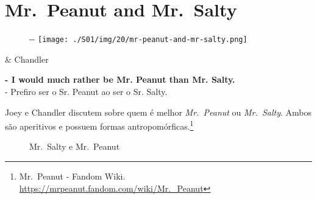 \hypertarget{mr.-peanut-and-mr.-salty}{%
\section{Mr.~Peanut and Mr.~Salty}\label{mr.-peanut-and-mr.-salty}}

\begin{figure}[!ht]
  \begin{adjustwidth}{-\oddsidemargin-1in}{-\rightmargin}
    \centering
    \texttt{[image: ./S01/img/20/mr-peanut-and-mr-salty.png]}
  \end{adjustwidth}
\end{figure}

\begin{tcolorbox}[enhanced,center upper,
    drop fuzzy shadow southeast, boxrule=0.3pt,
    lower separated=false, breakable,
    colframe=black!30!dialogoBorder,colback=white]
\begin{minipage}[c]{0.16\linewidth}
   & \centering \scriptsize{Chandler}
\end{minipage}
\hfill
\begin{minipage}[c]{0.8\linewidth}
  \textbf{- I would much rather be Mr. Peanut than Mr. Salty.}\\
  - Prefiro ser o Sr. Peanut ao ser o Sr. Salty.
\end{minipage}
\end{tcolorbox}

\saveparinfos
\noindent
\begin{minipage}[c]{0.5\textwidth}\useparinfo

Joey e Chandler discutem sobre quem é melhor \emph{Mr.~Peanut} ou
\emph{Mr.~Salty}. Ambos são aperitivos e possuem formas
antropomórficas.\footnote{\sloppy Mr. Peanut - Fandom Wiki. \url{https://mrpeanut.fandom.com/wiki/Mr._Peanut}}

\end{minipage}\hfill
\begin{minipage}[c]{0.5\textwidth}

\begin{figure}
  \centering
    \caption{Mr. Salty e Mr. Peanut\label{fig:mr-salty-e-mr-peanut}}
\end{figure}

\end{minipage}

